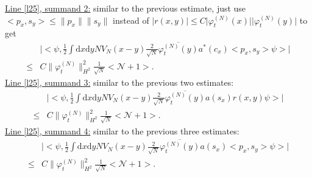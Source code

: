 \documentclass[11pt,a4paper]{scrartcl}
\newcommand{\di}{\textrm{d}}		%
\newcommand{\Ncal}{\mathcal{N}}		%
\newcommand{\estlist}[2]{\underline{Line \ref{l#1}, summand #2:}}
\newcommand{\scal}[2]{\big<#1,#2\big>} %
\newcommand{\cc}[1]{\overline{#1}}	%
\newcommand{\norm}[1]{\lVert#1\rVert}	%
\newcommand{\ev}[1]{\big<#1\big>}	%
\newcommand{\ph}{\varphi_t^{(N)}}	%
\newcommand{\dxyNV}{\frac{1}{2}\int \di x\di y N V_N(x-y)} %
\begin{document}
\estlist{25}{2} similar to the previous estimate, just use $\scal{p_x}{s_y} \leq \norm{p_x}\norm{s_y}$ instead of $\lvert r(x,y)\rvert \leq C\lvert\ph(x)\rvert\lvert \ph(y)\rvert$ to get
\begin{align*}
 & \lvert \scal{\psi}{\dxyNV \frac{2}{\sqrt{N}}\cc{\ph(y)} a^\ast(c_x) \scal{p_x}{s_y}\psi} \rvert \\
\leq & C \norm{\ph}_{H^2}^2 \frac{1}{\sqrt{N}} \ev{\Ncal+1}.
\end{align*}
\estlist{25}{3} similar to the previous two estimates:
\begin{align*}
 & \lvert \scal{\psi}{\dxyNV \frac{2}{\sqrt{N}}\cc{\ph(y)}a(s_x)r(x,y)\psi} \rvert \\
\leq & C\norm{\ph}_{H^2}^2 \frac{1}{\sqrt{N}} \ev{\Ncal+1}.
\end{align*}
\estlist{25}{4} similar to the previous three estimates:
\begin{align*}
& \lvert \scal{\psi}{\dxyNV \frac{2}{\sqrt{N}}\cc{\ph(y)} a(s_x) \scal{p_x}{s_y} \psi} \rvert \\
\leq & C\norm{\ph}_{H^2}^2 \frac{1}{\sqrt{N}}\ev{\Ncal+1}. 
\end{align*}

\end{document}
